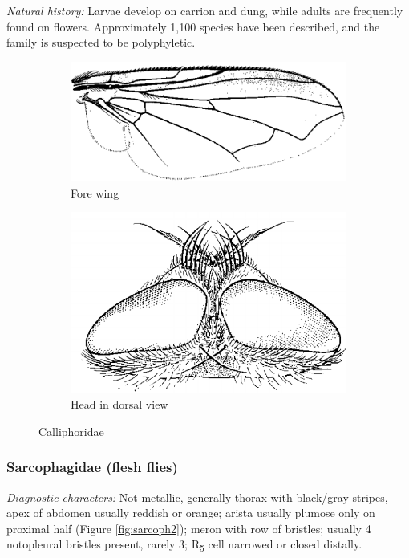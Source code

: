 \documentclass[letterpaper, 11pt]{article}
\begin{document}
\noindent{}\textit{Natural history:} Larvae develop on carrion and dung, while adults are frequently found on flowers. Approximately 1,100 species have been described, and the family is suspected to be polyphyletic.

\begin{figure}[ht!]
    \centering
    \begin{subfigure}[ht!]{0.5\textwidth}
        \includegraphics[width=\textwidth]{CalliphoridWing}
        \caption{Fore wing \citep[][Fig. 106.6]{mcalpine1981manualv2}}
        \label{fig:calliphorid1}
    \end{subfigure}
    \qquad
    \begin{subfigure}[ht!]{0.3\textwidth}
        \includegraphics[width=\textwidth]{CalliphoridHead}
        \caption{Head in dorsal view \citep[][Fig. 106.18]{mcalpine1981manualv2}}
        \label{fig:calliphorid2}
    \end{subfigure}
    \caption{Calliphoridae}\label{fig:calliphorids}
\end{figure}

\subsubsection{Sarcophagidae (flesh flies)}
\noindent{}\textit{Diagnostic characters:} Not metallic, generally thorax with black/gray stripes, apex of abdomen usually reddish or orange; arista usually plumose only on proximal half (Figure \ref{fig:sarcoph2}); meron with row of bristles; usually 4 notopleural bristles present, rarely 3; \texorpdfstring{R\textsubscript{5}}{R5} cell narrowed or closed distally.\\
\end{document}
